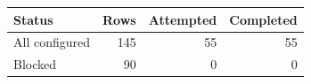 \begin{tabular}{lrrr}
\toprule
Status & Rows & Attempted & Completed \\
\midrule
All configured & 145 & 55 & 55 \\
Blocked & 90 & 0 & 0 \\
\bottomrule
\end{tabular}
